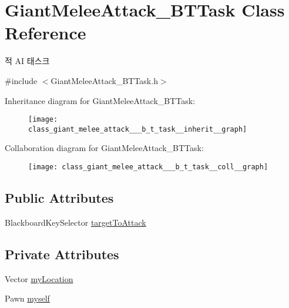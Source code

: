 \hypertarget{class_giant_melee_attack___b_t_task}{}\section{Giant\+Melee\+Attack\+\_\+\+B\+T\+Task Class Reference}
\label{class_giant_melee_attack___b_t_task}


적 AI 태스크  




{\ttfamily \#include $<$Giant\+Melee\+Attack\+\_\+\+B\+T\+Task.\+h$>$}



Inheritance diagram for Giant\+Melee\+Attack\+\_\+\+B\+T\+Task\+:
\nopagebreak
\begin{figure}[H]
\begin{center}
\leavevmode
\texttt{[image: class\_giant\_melee\_attack\_\_\_b\_t\_task\_\_inherit\_\_graph]}
\end{center}
\end{figure}


Collaboration diagram for Giant\+Melee\+Attack\+\_\+\+B\+T\+Task\+:
\nopagebreak
\begin{figure}[H]
\begin{center}
\leavevmode
\texttt{[image: class\_giant\_melee\_attack\_\_\_b\_t\_task\_\_coll\_\_graph]}
\end{center}
\end{figure}
\subsection*{Public Attributes}
\begin{DoxyCompactItemize}
\item 
Blackboard\+Key\+Selector \hyperlink{class_giant_melee_attack___b_t_task_ace477d8d2d2c02e1ae5220e36e60b6ac}{target\+To\+Attack}
\end{DoxyCompactItemize}
\subsection*{Private Attributes}
\begin{DoxyCompactItemize}
\item 
Vector \hyperlink{class_giant_melee_attack___b_t_task_a6d7cb8d701fc5a62d10180592a1727bf}{my\+Location}
\item 
Pawn \hyperlink{class_giant_melee_attack___b_t_task_a30dd53d02e844eab55652c2fc628b53c}{myself}
\end{DoxyCompactItemize}


